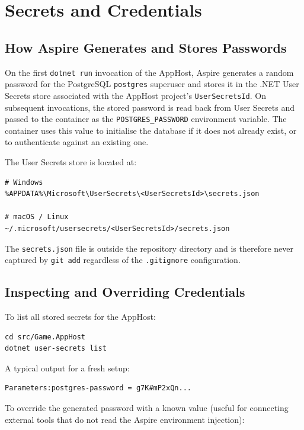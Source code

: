 \section{Secrets and Credentials}
\label{sec:secrets}

\subsection{How Aspire Generates and Stores Passwords}

On the first \texttt{dotnet run} invocation of the AppHost, Aspire generates a random password for the PostgreSQL \texttt{postgres} superuser and stores it in the .NET User Secrets store associated with the AppHost project's \texttt{UserSecretsId}. On subsequent invocations, the stored password is read back from User Secrets and passed to the container as the \texttt{POSTGRES\_PASSWORD} environment variable. The container uses this value to initialise the database if it does not already exist, or to authenticate against an existing one.

The User Secrets store is located at:

\begin{lstlisting}
# Windows
%APPDATA%\Microsoft\UserSecrets\<UserSecretsId>\secrets.json

# macOS / Linux
~/.microsoft/usersecrets/<UserSecretsId>/secrets.json
\end{lstlisting}

The \texttt{secrets.json} file is outside the repository directory and is therefore never captured by \texttt{git add} regardless of the \texttt{.gitignore} configuration.

\subsection{Inspecting and Overriding Credentials}

To list all stored secrets for the AppHost:

\begin{lstlisting}
cd src/Game.AppHost
dotnet user-secrets list
\end{lstlisting}

A typical output for a fresh setup:

\begin{lstlisting}
Parameters:postgres-password = g7K#mP2xQn...
\end{lstlisting}

To override the generated password with a known value (useful for connecting external tools that do not read the Aspire environment injection):


